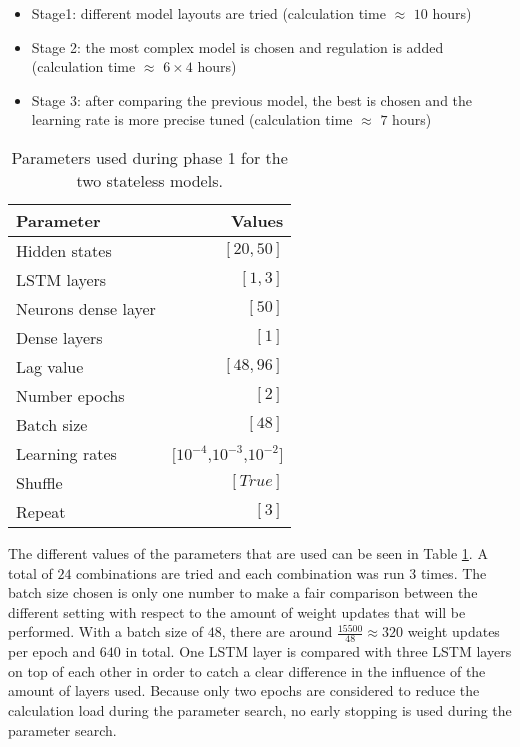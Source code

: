 \begin{itemize}
	\item Stage1: different model layouts are tried (calculation time $ \approx $ $ 10 $ hours)
	\item Stage 2: the most complex model is chosen and regulation is added (calculation time $ \approx $ $ 6\times4 $ hours)
	\item Stage 3: after comparing the previous model, the best is chosen and the learning rate is more precise tuned (calculation time $ \approx $ $7$ hours)
\end{itemize}

\begin{table}[ht]
	\centering
	\begin{tabular}{@{}l|r@{}} \toprule
		\textbf{Parameter}	& \textbf{Values}\\\midrule
		Hidden states &  $ [20,50] $\\
		LSTM layers & $ [1,3] $\\
		Neurons dense layer & $ [50] $\\
		Dense layers & $ [1] $\\
		Lag value & $ [48,96] $\\
		Number epochs & $ [2] $\\
		Batch size & $ [48] $\\
		Learning rates & $[ 10^{-4} $,$ 10^{-3} $,$ 10^{-2} ]$\\
		Shuffle & $ [True] $\\
		Repeat & $ [3] $\\\bottomrule
	\end{tabular}
	\caption{Parameters used during phase 1 for the two stateless models.}
	\label{tab:para_phase1}
\end{table}

The different values of the parameters that are used can be seen in Table \ref{tab:para_phase1}. A total of $ 24 $ combinations are tried and each combination was run $ 3 $ times. The batch size chosen is only one number to make a fair comparison between the different setting with respect to the amount of weight updates that will be performed. With a batch size of $ 48 $, there are around $ \frac{15500}{48}\approx 320 $ weight updates per epoch and $ 640 $ in total. One LSTM layer is compared with three LSTM layers on top of each other in order to catch a clear difference in the influence of the amount of layers used. Because only two epochs are considered to reduce the calculation load during the parameter search, no early stopping is used during the parameter search.\\


